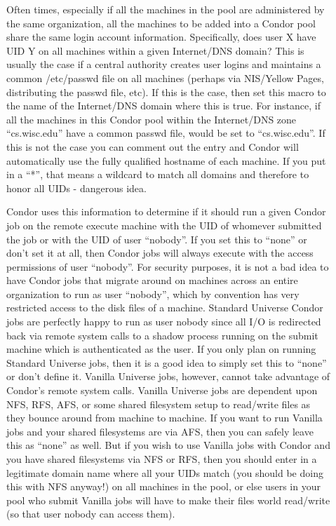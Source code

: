 \begin{description}

\item[] \label{param:UidDomain} Often times,
  especially if all the machines in the pool are administered by the
  same organization, all the machines to be added into a Condor pool
  share the same login account information.  Specifically, does user X
  have UID Y on all machines within a given Internet/DNS domain? This
  is usually the case if a central authority creates user logins and
  maintains a common /etc/passwd file on all machines (perhaps via
  NIS/Yellow Pages, distributing the passwd file, etc). If this is the
  case, then set this macro to the name of the Internet/DNS domain
  where this is true. For instance, if all the machines in this Condor
  pool within the Internet/DNS zone ``cs.wisc.edu'' have a common
  passwd file,  would be set to ``cs.wisc.edu''. If
  this is not the case you can comment out the entry and Condor will
  automatically use the fully qualified hostname of each machine.  If
  you put in a ``*'', that means a wildcard to match all domains and
  therefore to honor all UIDs - dangerous idea.
          
  Condor uses this information to determine if it should run a given
  Condor job on the remote execute machine with the UID of whomever
  submitted the job or with the UID of user ``nobody''.  If you set
  this to ``none'' or don't set it at all, then Condor jobs will
  always execute with the access permissions of user ``nobody''.  For
  security purposes, it is not a bad idea to have Condor jobs that
  migrate around on machines across an entire organization to run as
  user ``nobody'', which by convention has very restricted access to
  the disk files of a machine.  Standard Universe Condor jobs are
  perfectly happy to run as user nobody since all I/O is redirected
  back via remote system calls to a shadow process running on the
  submit machine which is authenticated as the user.  If you only plan
  on running Standard Universe jobs, then it is a good idea to simply
  set this to ``none'' or don't define it.  Vanilla Universe jobs,
  however, cannot take advantage of Condor's remote system calls.
  Vanilla Universe jobs are dependent upon NFS, RFS, AFS, or some
  shared filesystem setup to read/write files as they bounce around
  from machine to machine. If you want to run Vanilla jobs and your
  shared filesystems are via AFS, then you can safely leave this as
  ``none'' as well. But if you wish to use Vanilla jobs with Condor
  and you have shared filesystems via NFS or RFS, then you should
  enter in a legitimate domain name where all your UIDs match (you
  should be doing this with NFS anyway!) on all machines in the pool,
  or else users in your pool who submit Vanilla jobs will have to make
  their files world read/write (so that user nobody can access them).
          

\end{description}
